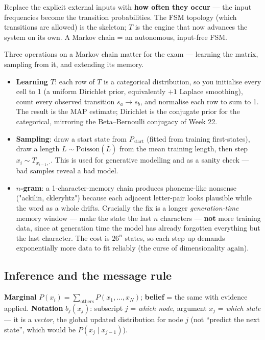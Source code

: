\documentclass[11pt, a4paper]{article}
\newcommand{\kw}[1]{\textbf{#1}}
\begin{document}
\begin{notebox}
Replace the explicit external inputs with \kw{how often they occur} — the input frequencies become
the transition probabilities. The FSM topology (which transitions are allowed) is the skeleton; $T$
is the engine that now advances the system on its own. A Markov chain = an autonomous, input-free FSM.
\end{notebox}

Three operations on a Markov chain matter for the exam — learning the matrix, sampling from it, and
extending its memory.

\begin{itemize}
  \item \kw{Learning $T$}: each row of $T$ is a categorical distribution, so you initialise every
  cell to 1 (a uniform Dirichlet prior, equivalently $+1$ Laplace smoothing), count every observed
  transition $s_a\to s_b$, and normalise each row to sum to 1. The result is the MAP estimate;
  Dirichlet is the conjugate prior for the categorical, mirroring the Beta--Bernoulli conjugacy of
  Week 22.
  \item \kw{Sampling}: draw a start state from $P_{\text{start}}$ (fitted from training first-states),
  draw a length $L\sim\text{Poisson}(\bar L)$ from the mean training length, then step
  $x_i\sim T_{x_{i-1},\cdot}$. This is used for generative modelling and as a sanity check — bad
  samples reveal a bad model.
  \item \kw{$n$-gram}: a 1-character-memory chain produces phoneme-like nonsense ("ackilin,
  ckleryhtz") because each adjacent letter-pair looks plausible while the word as a whole drifts.
  Crucially the fix is a longer \emph{generation-time} memory window — make the state the last $n$
  characters — \kw{not} more training data, since at generation time the model has already forgotten
  everything but the last character. The cost is $26^n$ states, so each step up demands
  exponentially more data to fit reliably (the curse of dimensionality again).
\end{itemize}

\subsection{Inference and the message rule}

\kw{Marginal} $P(x_i)=\sum_{\text{others}}P(x_1,\dots,x_N)$; \kw{belief} = the same with evidence
applied. \kw{Notation} $b_j(x_j)$: subscript $j$ = \emph{which node}, argument $x_j$ = \emph{which
state} — it is a \emph{vector}, the global updated distribution for node $j$ (not ``predict the next
state'', which would be $P(x_j\mid x_{j-1})$).
\end{document}
